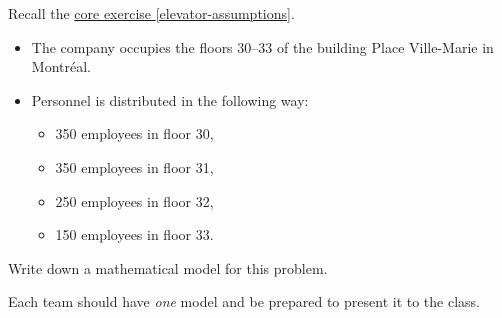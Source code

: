 \begin{minipage}{.5\textwidth}	
\question \label{model:preclass}
Recall the \hyperref[elevator-assumptions]{core exercise \ref{elevator-assumptions}}.

\begin{itemize}
	\item The company occupies the floors 30--33 of the building Place Ville-Marie in Montr\'eal.

	\item Personnel is distributed in the following way: 
	\begin{itemize}
		\item 350 employees in floor 30,
		\item 350 employees in floor 31,
		\item 250 employees in floor 32, 
		\item 150 employees in floor 33.
	\end{itemize}
\end{itemize}


Write down a mathematical model for this problem.
\label{elevator-model}

\begin{teamwork}
Each team should have \emph{one} model and be prepared to present it to the class.	
\end{teamwork}

\end{minipage}
\qquad
\begin{minipage}{.5\textwidth}	
\email
\end{minipage}

